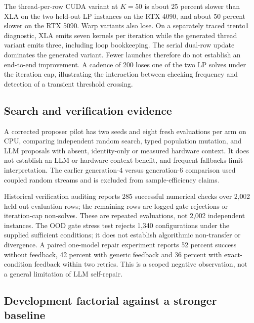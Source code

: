 The thread-per-row CUDA variant at $K=50$ is about 25 percent slower than XLA
on the two held-out LP instances on the RTX 4090, and about 50 percent slower
on the RTX 5090. Warp variants also lose. On a separately traced trento1
diagnostic, XLA emits seven kernels per iteration while the generated thread
variant emits three, including loop bookkeeping. The serial dual-row update
dominates the generated variant. Fewer launches therefore do not establish
an end-to-end improvement. A cadence of 200 loses one of the two LP solves
under the iteration cap, illustrating the interaction between checking
frequency and detection of a transient threshold crossing.

\subsection{Search and verification evidence}

A corrected proposer pilot has two seeds and eight fresh evaluations per arm
on CPU, comparing independent random search, typed population mutation, and
LLM proposals with absent, identity-only or measured hardware context. It does
not establish an LLM or hardware-context benefit, and frequent fallbacks limit
interpretation. The earlier generation-4 versus generation-6 comparison used
coupled random streams and is excluded from sample-efficiency claims.

Historical verification auditing reports 285 successful numerical checks over
2{,}002 held-out evaluation rows; the remaining rows are logged gate rejections
or iteration-cap non-solves. These are repeated evaluations, not 2{,}002
independent instances. The OOD gate stress test rejects 1{,}340 configurations
under the supplied sufficient conditions; it does not establish algorithmic
non-transfer or divergence. A paired one-model repair experiment reports
52 percent success without feedback, 42 percent with generic feedback and
36 percent with exact-condition feedback within two retries. This is a scoped
negative observation, not a general limitation of LLM self-repair.

\subsection{Development factorial against a stronger baseline}

